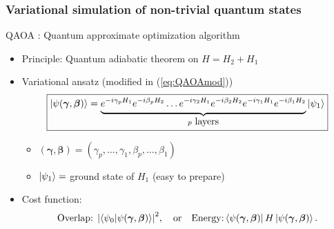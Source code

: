 \documentclass{beamer}
\theoremstyle{definition}
\begin{document}
\begin{frame}
\frametitle{Variational simulation of non-trivial quantum states}

QAOA \cite{QAOA}: Quantum approximate optimization algorithm


\begin{itemize}
	\item Principle: Quantum adiabatic theorem on $H = H_2 + H_1$

	
	\item Variational ansatz (modified in (\ref{eq:QAOAmod}))
	\begin{equation}\label{eq:QAOA}
	\boxed{\left\vert{\psi(\bm{\gamma}, \bm{\beta})}\right\rangle = \underbrace{ \strut {e^{-i\gamma_p H_1}e^{-i\beta_p H_2}} \dots {e^{-i\gamma_2 H_1}e^{-i\beta_2 H_2}} {e^{-i\gamma_1 H_1}e^{-i\beta_1 H_2}}}_{ p \mbox{ layers}} \left\vert{\psi_1}\right\rangle}
	\end{equation}
	\begin{itemize}
		\item $(\bm\gamma,\bm\beta) = (\gamma_p,\dots, \gamma_1,\beta_p,\dots, \beta_1)$
		
		\item $\left\vert{\psi_1}\right\rangle = $ ground state of $H_1$ (easy to prepare)
	\end{itemize}

	
	\item Cost function:
	\begin{equation*}
	\text{Overlap: } \abs{\braket{\psi_0}{\psi(\bm\gamma,\bm\beta)}}^2 ,\quad \text{or} \quad \text{Energy:} \left\langle{\psi(\bm\gamma,\bm\beta)}\right\vert H\left\vert{\psi(\bm\gamma,\bm\beta)}\right\rangle.
	\end{equation*}
\end{itemize}


\end{frame}

\end{document}
